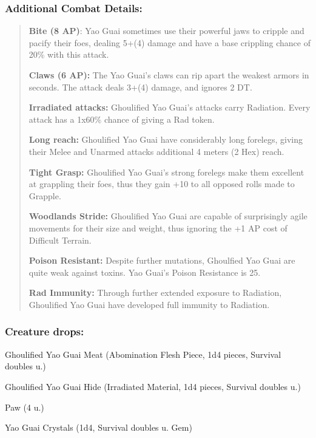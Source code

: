 \documentclass[11pt,a4paper,twocolumn]{book}
\begin{document}
	\subsubsection*{Additional Combat Details:}
	\begin{verse}
		\textbf{Bite (8 AP)}: Yao Guai sometimes use their powerful jaws to cripple and pacify their foes, dealing 5+(4) damage and have a base crippling chance of 20\% with this attack.
		
		\textbf{Claws (6 AP):} The Yao Guai's claws can rip apart the weakest armors in seconds. The attack deals 3+(4) damage, and ignores 2 DT.
		
		\textbf{Irradiated attacks:} Ghoulified Yao Guai's attacks carry Radiation. Every attack has a 1x60\% chance of giving a Rad token. 
		
		\textbf{Long reach:} Ghoulified Yao Guai have considerably long forelegs, giving their Melee and Unarmed attacks additional 4 meters (2 Hex) reach.
		
		\textbf{Tight Grasp:} Ghoulified Yao Guai's strong forelegs make them excellent at grappling their foes, thus they gain +10 to all opposed rolls made to Grapple.
		
		\textbf{Woodlands Stride:} Ghoulified Yao Guai are capable of surprisingly agile movements for their size and weight, thus ignoring the +1 AP cost of Difficult Terrain.
		
		\textbf{Poison Resistant:} Despite further mutations, Ghoulfied Yao Guai are quite weak against toxins. Yao Guai's Poison Resistance is 25.
		
		\textbf{Rad Immunity:} Through further extended exposure to Radiation, Ghoulified Yao Guai have developed full immunity to Radiation.
	\end{verse}
	
	\subsubsection*{Creature drops:}
	\begin{compactitem}
		\item Ghoulified Yao Guai Meat (Abomination Flesh Piece, 1d4 pieces, Survival doubles u.)
		\item Ghoulified Yao Guai Hide (Irradiated Material, 1d4 pieces, Survival doubles u.)
		\item Paw (4 u.)
		\item Yao Guai Crystals (1d4, Survival doubles u. Gem)
	\end{compactitem}
	
\end{document}
